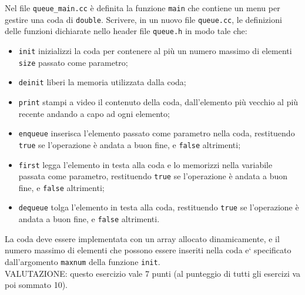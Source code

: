 Nel file {\tt queue\_main.cc} \`e definita la funzione {\tt main} che
contiene un menu per gestire una coda di {\tt double}. 
Scrivere, in un nuovo file {\tt queue.cc}, 
le definizioni delle funzioni dichiarate nello header file \texttt{queue.h} 
in modo tale che:
\begin{itemize}
\item
\texttt{init} inizializzi la coda per contenere al pi\`u un numero massimo di elementi
{\tt size} passato come parametro;
\item 
\texttt{deinit} liberi la memoria utilizzata dalla coda;
\item
\texttt{print} stampi a video il contenuto della coda, dall'elemento
pi\`u vecchio al pi\`u recente andando a capo ad ogni elemento;
\item
\texttt{enqueue} inserisca l'elemento passato come parametro nella coda,
restituendo {\tt true} se l'operazione \`e andata a buon fine, 
e {\tt false} altrimenti;
\item
\texttt{first} legga l'elemento in testa alla coda e lo memorizzi nella
variabile passata come parametro,
restituendo {\tt true} se l'operazione \`e andata a buon fine,
e {\tt false} altrimenti;
\item
\texttt{dequeue} tolga l'elemento in testa alla coda,
restituendo {\tt true} se l'operazione \`e andata a buon fine, 
e {\tt false} altrimenti.
\end{itemize}

La coda deve essere implementata con un array allocato dinamicamente, e il numero
massimo di elementi che possono essere inseriti nella coda e` specificato
dall'argomento {\tt maxnum} della funzione {\tt init}.\\


VALUTAZIONE:
questo esercizio vale 7 punti 
(al punteggio di tutti gli esercizi va poi sommato 10).

